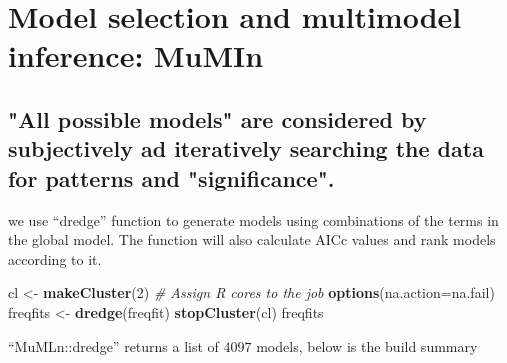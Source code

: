 \documentclass[
]{article}
\newenvironment{Shaded}{\begin{snugshade}}{\end{snugshade}}
\newcommand{\CommentTok}[1]{\textcolor[rgb]{0.56,0.35,0.01}{\textit{#1}}}
\newcommand{\DataTypeTok}[1]{\textcolor[rgb]{0.13,0.29,0.53}{#1}}
\newcommand{\DecValTok}[1]{\textcolor[rgb]{0.00,0.00,0.81}{#1}}
\newcommand{\KeywordTok}[1]{\textcolor[rgb]{0.13,0.29,0.53}{\textbf{#1}}}
\newcommand{\NormalTok}[1]{#1}
\newcommand{\StringTok}[1]{\textcolor[rgb]{0.31,0.60,0.02}{#1}}
\begin{document}
\section{Model selection and multimodel inference: MuMIn}
\label{sec:Model selection and multimodel inference: MuMIn}

\singlespace

\subsection{"All possible models" are considered by subjectively ad iteratively searching the data for patterns and "significance".}
\label{ssec:Data_mining}

we use ``dredge'' function to generate models using combinations of the
terms in the global model. The function will also calculate AICc values
and rank models according to it.

\small

\begin{Shaded}
\begin{Highlighting}[]
\NormalTok{ cl <-}\StringTok{ }\KeywordTok{makeCluster}\NormalTok{(}\DecValTok{2}\NormalTok{) }\CommentTok{# Assign R cores to the job}
 \KeywordTok{options}\NormalTok{(}\DataTypeTok{na.action=}\NormalTok{na.fail)}
\NormalTok{ freqfits <-}\StringTok{ }\KeywordTok{dredge}\NormalTok{(freqfit)}
 \KeywordTok{stopCluster}\NormalTok{(cl)}
\NormalTok{ freqfits}
\end{Highlighting}
\end{Shaded}

\normalsize

``MuMLn::dredge'' returns a list of \(4097\) models, below is the build
summary
\end{document}
